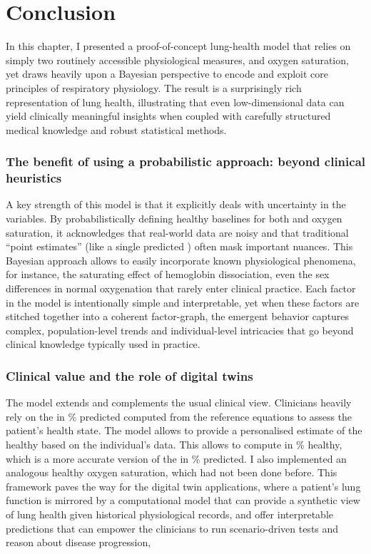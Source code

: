 

\section{Conclusion}

In this chapter, I presented a proof-of-concept lung-health model that relies on simply two routinely accessible physiological measures, \F and oxygen saturation, yet draws heavily upon a Bayesian perspective to encode and exploit core principles of respiratory physiology. The result is a surprisingly rich representation of lung health, illustrating that even low-dimensional data can yield clinically meaningful insights when coupled with carefully structured medical knowledge and robust statistical methods.

\subsubsection{The benefit of using a probabilistic approach: beyond clinical heuristics}
A key strength of this model is that it explicitly deals with uncertainty in the variables. By probabilistically defining healthy baselines for both \F and oxygen saturation, it acknowledges that real-world data are noisy and that traditional “point estimates” (like a single predicted \F) often mask important nuances. This Bayesian approach allows to easily incorporate known physiological phenomena, for instance, the saturating effect of hemoglobin dissociation, even the sex differences in normal oxygenation that rarely enter clinical practice. Each factor in the model is intentionally simple and interpretable, yet when these factors are stitched together into a coherent factor-graph, the emergent behavior captures complex, population-level trends and individual-level intricacies that go beyond clinical knowledge typically used in practice.

\subsubsection{Clinical value and the role of digital twins}
The model extends and complements the usual clinical view. Clinicians heavily rely on the \F in \% predicted computed from the reference equations to assess the patient's health state. The model allows to provide a personalised estimate of the healthy \F based on the individual's data. This allows to compute \F in \% healthy, which is a more accurate version of the \F in \% predicted. I also implemented an analogous healthy oxygen saturation, which had not been done before. This framework paves the way for the digital twin applications, where a patient's lung function is mirrored by a computational model that can provide a synthetic view of lung health given historical physiological records, and offer interpretable predictions that can empower the clinicians to run scenario-driven tests and reason about disease progression,

